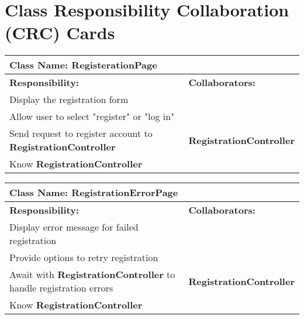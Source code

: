 \documentclass[]{article}
\begin{document}

	
\section{Class Responsibility Collaboration (CRC) Cards}
\label{sec:class_responsibility_collaboration_crc_cards}
\begin{table}[H]
        \centering
        \begin{tabular}{|p{5cm}|p{5cm}|}
        \hline 
         \multicolumn{2}{|l|}{\textbf{Class Name:} RegisterationPage} \\
        \hline
        \textbf{Responsibility:} & \textbf{Collaborators:} \\
        \hline
        Display the registration form &  \phantom{} \\
        \hline
        Allow user to select "register" or  "log in" & \phantom{} \\
        \hline
        Send request to register account to \textbf{RegistrationController} & \textbf{RegistrationController} \\
        \hline
        Know \textbf{RegistrationController} & \phantom{} \\
        \hline
        \end{tabular}
    \end{table}

\begin{table}[H]
    \centering
    \begin{tabular}{|p{5cm}|p{5cm}|}
        \hline 
         \multicolumn{2}{|l|}{\textbf{Class Name:} RegistrationErrorPage} \\
        \hline
        \textbf{Responsibility:} & \textbf{Collaborators:} \\
        \hline
        Display error message for failed registration &  \phantom{} \\
        \hline
        Provide options to retry registration & \phantom{} \\
        \hline
        Await with \textbf{RegistrationController} to handle registration errors & \textbf{RegistrationController} \\
        \hline
        Know \textbf{RegistrationController} & \phantom{} \\
        \hline
        \end{tabular}
    \end{table}
\end{document}

